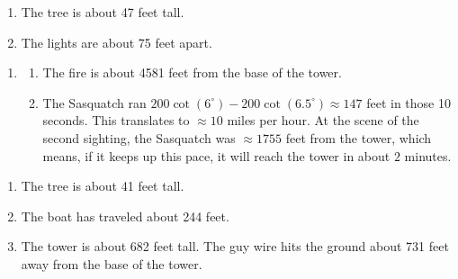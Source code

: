 \documentclass{ximera}
\begin{document}
\begin{enumerate}

\setcounter{enumi}{\value{HW}}

\item The tree is about 47 feet tall.

\item The lights are about 75 feet apart.

\setcounter{HW}{\value{enumi}}

\end{enumerate}

\begin{enumerate}

\setcounter{enumi}{\value{HW}}

\item \begin{enumerate}

\addtocounter{enumii}{1}

\item The fire is about 4581 feet from the base of the tower.

\item  The Sasquatch ran $200\cot(6^{\circ}) - 200\cot(6.5^{\circ}) \approx 147$ feet in those 10 seconds. This translates to $\approx 10$ miles per hour.  At the scene of the second sighting, the Sasquatch was $\approx 1755$ feet from the tower, which means, if it keeps up this pace, it will reach the tower in about $2$ minutes.

\end{enumerate}

\setcounter{HW}{\value{enumi}}

\end{enumerate}

\begin{enumerate}

\setcounter{enumi}{\value{HW}}

\item  The tree is about 41 feet tall.

\item The boat has traveled about 244 feet.

\item  The tower is about 682 feet tall. The guy wire hits the ground about  731 feet away from the base of the tower.

\setcounter{HW}{\value{enumi}}

\end{enumerate}
\end{document}
